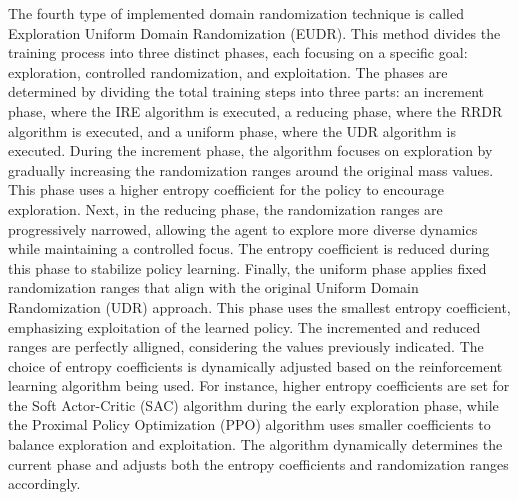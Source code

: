 \documentclass[12pt]{article}
\begin{document}
The fourth type of implemented domain randomization technique is called Exploration Uniform Domain Randomization (EUDR). This method divides the training process into three distinct phases, each focusing on a specific goal: exploration, controlled randomization, and exploitation. The phases are determined by dividing the total training steps into three parts: an increment phase, where the IRE algorithm is executed, a reducing phase, where the RRDR algorithm is executed, and a uniform phase, where the UDR algorithm is executed. During the increment phase, the algorithm focuses on exploration by gradually increasing the randomization ranges around the original mass values. This phase uses a higher entropy coefficient for the policy to encourage exploration. Next, in the reducing phase, the randomization ranges are progressively narrowed, allowing the agent to explore more diverse dynamics while maintaining a controlled focus. The entropy coefficient is reduced during this phase to stabilize policy learning. Finally, the uniform phase applies fixed randomization ranges that align with the original Uniform Domain Randomization (UDR) approach. This phase uses the smallest entropy coefficient, emphasizing exploitation of the learned policy. The incremented and reduced ranges are perfectly alligned, considering the values previously indicated. The choice of entropy coefficients is dynamically adjusted based on the reinforcement learning algorithm being used. For instance, higher entropy coefficients are set for the Soft Actor-Critic (SAC) algorithm during the early exploration phase, while the Proximal Policy Optimization (PPO) algorithm uses smaller coefficients to balance exploration and exploitation. The algorithm dynamically determines the current phase and adjusts both the entropy coefficients and randomization ranges accordingly.
\end{document}
